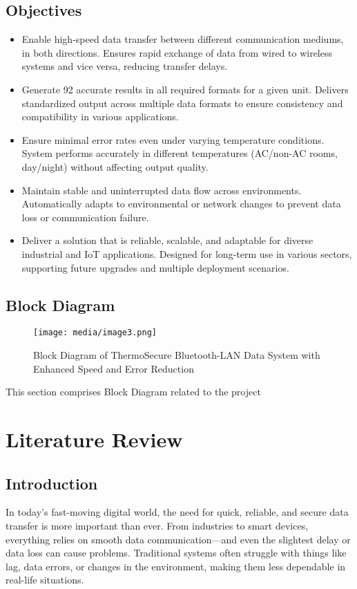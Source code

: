 \documentclass[12pt]{report}
\begin{document}
\section{Objectives}
\begin{itemize}
    \item Enable high-speed data transfer between different communication mediums, in both directions. Ensures rapid exchange of data from wired to wireless systems and vice versa, reducing transfer delays.
    \item Generate 92 accurate results in all required formats for a given unit. Delivers standardized output across multiple data formats to ensure consistency and compatibility in various applications.
    \item Ensure minimal error rates even under varying temperature conditions. System performs accurately in different temperatures (AC/non-AC rooms, day/night) without affecting output quality.
    \item Maintain stable and uninterrupted data flow across environments. Automatically adapts to environmental or network changes to prevent data loss or communication failure.
    \item Deliver a solution that is reliable, scalable, and adaptable for diverse industrial and IoT applications. Designed for long-term use in various sectors, supporting future upgrades and multiple deployment scenarios.
\end{itemize}

\section{Block Diagram}
\begin{figure}[ht]
    \centering
    \texttt{[image: media/image3.png]}
    \caption{Block Diagram of ThermoSecure Bluetooth-LAN Data System with Enhanced Speed and Error Reduction}
    \label{fig:block_diagram}
\end{figure}
This section comprises Block Diagram related to the project

\chapter{Literature Review}
\section{Introduction}
In today's fast-moving digital world, the need for quick, reliable, and secure data transfer is more important than ever. From industries to smart devices, everything relies on smooth data communication—and even the slightest delay or data loss can cause problems. Traditional systems often struggle with things like lag, data errors, or changes in the environment, making them less dependable in real-life situations.
\end{document}
